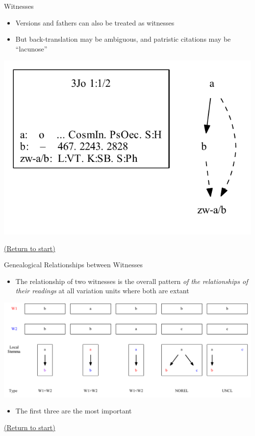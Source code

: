 \documentclass[10pt]{beamer}
\begin{document}
	\begin{frame}{Witnesses}
		\begin{itemize}
			\item Versions and fathers can also be treated as witnesses
			\item But back-translation may be ambiguous, and patristic citations may be ``lacunose''
		\end{itemize}
		\begin{center}
			\includegraphics[scale=0.5]{../graphics/B25K1V1U2-local-stemma-versions-fathers.pdf}
		\end{center}
		\begin{center}
			\hyperlink{slide:crossroad}{(Return to start)}
		\end{center}
	\end{frame}
	\begin{frame}{Genealogical Relationships between Witnesses}\label{slide:genealogical-relationships}
		\begin{itemize}
			\item The relationship of two witnesses is the overall pattern \emph{of the relationships of their readings} at all variation units where both are extant
		\end{itemize}
		\begin{center}
			\includegraphics[width=\textwidth]{../graphics/genealogical-relationships.pdf}
		\end{center}
		\begin{itemize}
			\item The first three are the most important
		\end{itemize}
		\begin{center}
			\hyperlink{slide:crossroad}{(Return to start)}
		\end{center}
	\end{frame}
\end{document}
